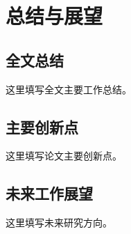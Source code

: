 \chapter{总结与展望}

\section{全文总结}

这里填写全文主要工作总结。

\section{主要创新点}

这里填写论文主要创新点。

\section{未来工作展望}

这里填写未来研究方向。
